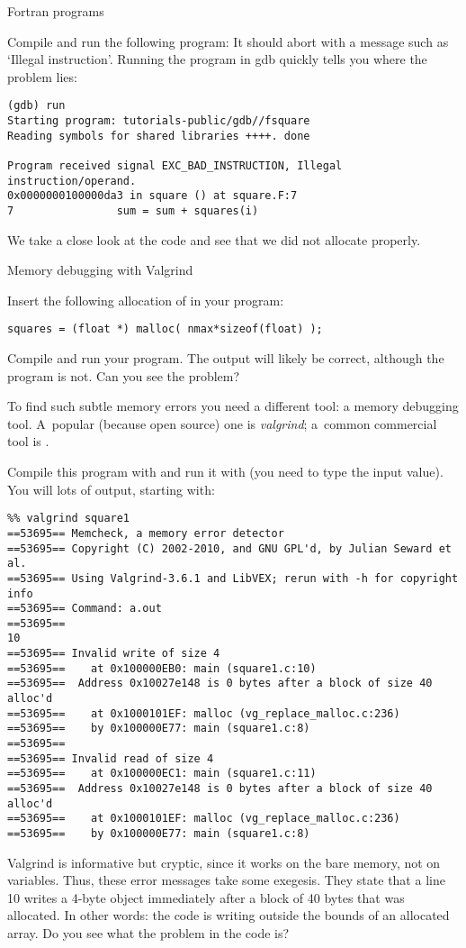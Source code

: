  {Fortran programs}

Compile and run the following program:
It should abort with a message such as `Illegal instruction'.
Running the program in gdb quickly tells you where the problem lies:
\begin{verbatim}
(gdb) run
Starting program: tutorials-public/gdb//fsquare 
Reading symbols for shared libraries ++++. done

Program received signal EXC_BAD_INSTRUCTION, Illegal instruction/operand.
0x0000000100000da3 in square () at square.F:7
7                sum = sum + squares(i)
\end{verbatim}
We take a close look at the code and see that we did not allocate
 properly.

 {Memory debugging with Valgrind}
\label{sec:valgrind}

Insert the following allocation of  in your program:
\begin{verbatim}
squares = (float *) malloc( nmax*sizeof(float) );
\end{verbatim}
Compile and run your program. The output will likely be correct,
although the program is not. Can you see the problem?


To find such subtle memory errors you need a different tool: a memory
debugging tool. A~popular (because open source) one is
\emph{valgrind}; a~common commercial tool is .

%
Compile this program with  and run it with
 (you need to type the input value). You will lots
of output, starting with:
{\small
\begin{verbatim}
%% valgrind square1
==53695== Memcheck, a memory error detector
==53695== Copyright (C) 2002-2010, and GNU GPL'd, by Julian Seward et al.
==53695== Using Valgrind-3.6.1 and LibVEX; rerun with -h for copyright info
==53695== Command: a.out
==53695== 
10
==53695== Invalid write of size 4
==53695==    at 0x100000EB0: main (square1.c:10)
==53695==  Address 0x10027e148 is 0 bytes after a block of size 40 alloc'd
==53695==    at 0x1000101EF: malloc (vg_replace_malloc.c:236)
==53695==    by 0x100000E77: main (square1.c:8)
==53695== 
==53695== Invalid read of size 4
==53695==    at 0x100000EC1: main (square1.c:11)
==53695==  Address 0x10027e148 is 0 bytes after a block of size 40 alloc'd
==53695==    at 0x1000101EF: malloc (vg_replace_malloc.c:236)
==53695==    by 0x100000E77: main (square1.c:8)
\end{verbatim}
}
Valgrind is informative but cryptic, since it works on the bare
memory, not on variables. Thus, these error messages take some
exegesis. They state that a line 10 writes a 4-byte object immediately
after a block of 40 bytes that was allocated. In other words: the code
is writing outside the bounds of an allocated array. Do you see what
the problem in the code is?

